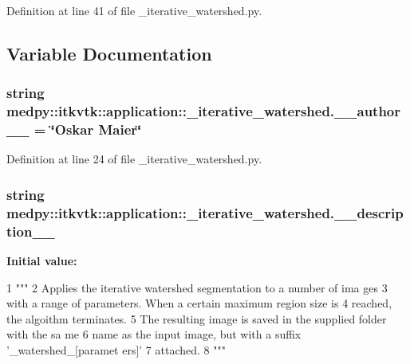 Definition at line 41 of file \_\-iterative\_\-watershed.py.



\subsection{Variable Documentation}
\hypertarget{namespacemedpy_1_1itkvtk_1_1application_1_1__iterative__watershed_a395d19efca7815b805ac3a16e17fdfa8}{
\subsubsection[{\_\-\_\-author\_\-\_\-}]{\setlength{\rightskip}{0pt plus 5cm}string {\bf medpy::itkvtk::application::\_\-iterative\_\-watershed.\_\-\_\-author\_\-\_\-} = \char`\"{}Oskar Maier\char`\"{}}}
\label{namespacemedpy_1_1itkvtk_1_1application_1_1__iterative__watershed_a395d19efca7815b805ac3a16e17fdfa8}


Definition at line 24 of file \_\-iterative\_\-watershed.py.

\hypertarget{namespacemedpy_1_1itkvtk_1_1application_1_1__iterative__watershed_ae350c881760491ef3857bdce50a503ae}{
\subsubsection[{\_\-\_\-description\_\-\_\-}]{\setlength{\rightskip}{0pt plus 5cm}string {\bf medpy::itkvtk::application::\_\-iterative\_\-watershed.\_\-\_\-description\_\-\_\-}}}
\label{namespacemedpy_1_1itkvtk_1_1application_1_1__iterative__watershed_ae350c881760491ef3857bdce50a503ae}
{\bfseries Initial value:}
\begin{DoxyCode}
1 """
2                   Applies the iterative watershed segmentation to a number of ima
      ges
3                   with a range of parameters. When a certain maximum region size 
      is
4                   reached, the algoithm terminates.
5                   The resulting image is saved in the supplied folder with the sa
      me
6                   name as the input image, but with a suffix '_watershed_[paramet
      ers]'
7                   attached.
8                   """
\end{DoxyCode}


